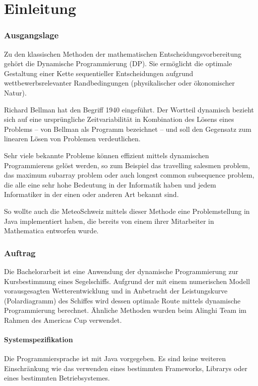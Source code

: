 \documentclass[a4paper,10pt]{article}
\begin{document}
\cleardoublepage
\begingroup
\pagestyle{empty}
\setcounter{tocdepth}{2}
\tableofcontents
\clearpage
\endgroup
       
\newpage

\setcounter{page}{1} 
\part{Einleitung}
\section{Ausgangslage}
Zu den klassischen Methoden der mathematischen Entscheidungsvorbereitung gehört
die Dynamische Programmierung (DP). Sie ermöglicht die optimale Gestaltung
einer Kette sequentieller Entscheidungen aufgrund wettbewerbsrelevanter
Randbedingungen (physikalischer oder ökonomischer Natur).

Richard Bellman hat den Begriff 1940 eingeführt. Der Wortteil dynamisch
bezieht sich auf eine ursprüngliche Zeitvariabilität in Kombination des Lösens
eines Problems -- von Bellman als Programm bezeichnet -- und soll den
Gegensatz zum linearen Lösen von Problemen verdeutlichen.

Sehr viele bekannte Probleme können effizient mittels dynamischen
Programmierens gelöst werden, so zum Beispiel das travelling salesmen problem,
das maximum subarray problem oder auch longest common subsequence problem, die
alle eine sehr hohe Bedeutung in der Informatik haben und jedem Informatiker
in der einen oder anderen Art bekannt sind.

So wollte auch die MeteoSchweiz mittels dieser Methode eine Problemstellung
in Java implementiert haben, die bereits von einem ihrer Mitarbeiter in
Mathematica entworfen wurde.

\section{Auftrag}
Die Bachelorarbeit ist eine Anwendung der dynamische Programmierung zur
Kursbestimmung eines Segelschiffs. Aufgrund der mit einem numerischen
Modell vorausgesagten Wetterentwicklung und in Anbetracht der Leistungskurve
(Polardiagramm) des Schiffes wird dessen optimale Route mittels dynamische
Programmierung berechnet. Ähnliche Methoden wurden beim Alinghi Team im Rahmen
des Americas Cup verwendet.

\subsection{Systemspezifikation}
Die Programmiersprache ist mit Java vorgegeben. Es sind keine weiteren
Einschränkung wie das verwenden eines bestimmten Frameworks, Librarys oder
eines bestimmten Betriebsystemes.
\end{document}
